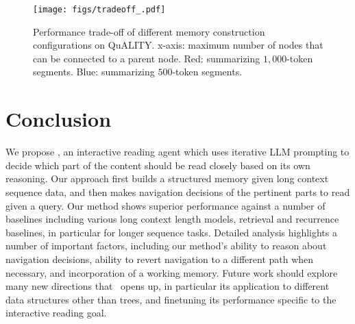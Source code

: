 \begin{figure}[t!]
    \centering
    \texttt{[image: figs/tradeoff\_.pdf]}
    \caption{
        Performance trade-off of different memory construction configurations on QuALITY. x-axis: maximum number of nodes that can be connected to a parent node. Red: summarizing $1,000$-token segments. Blue: summarizing $500$-token segments.
    }
    \label{fig:tradeoff}
    \vspace{-12pt}
\end{figure}\section{Conclusion}\label{sec:conclusion}
\vspace{-5pt}
We propose \sysname{}, an interactive reading agent 
which uses iterative LLM prompting to decide which part of the content should be read closely based on its own reasoning.
Our approach first builds a structured memory given long context sequence data, and then makes navigation decisions of the pertinent parts to read given a query.  
Our method shows superior performance against 
a number of baselines including various long context length models, retrieval and recurrence baselines,
in particular for longer sequence tasks.
Detailed analysis highlights a number of important factors, including our method's ability to reason about navigation decisions, ability to revert navigation to a different path when necessary, and incorporation of a working memory.
Future work should explore many new directions that \sysname{}~opens up, in particular its application to different data structures other than trees, and finetuning its performance specific to the interactive reading goal.

